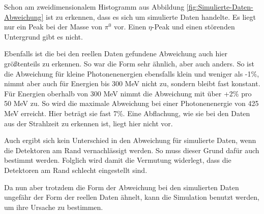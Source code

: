 \documentclass[a4paper,11pt,oneside,final,german,openbib,pdftex]{scrbook}
\begin{document}
{%

Schon am zweidimensionalem Histogramm aus Abbildung \ref{fig:Simulierte-Daten-Abweichung} ist zu erkennen, dass es sich um simulierte Daten handelte. Es liegt nur ein Peak bei der Masse von $\pi^0$ vor. Einen $\eta$-Peak und einen störenden Untergrund gibt es nicht. 

Ebenfalls ist die bei den reellen Daten gefundene Abweichung auch hier größtenteils zu erkennen. So war die Form sehr ähnlich, aber auch anders. So ist die Abweichung f\"ur kleine Photonenenergien ebensfalls klein und weniger als -1\%, nimmt aber auch f\"ur Energien bis 300 MeV nicht zu, sondern bleibt fast konstant. F\"ur Energien oberhalb von 300 MeV nimmt die Abweichung mit \"uber +2\% pro 50 MeV zu. So wird die maximale Abweichung bei einer Photonenenergie von 425 MeV erreicht. Hier betr\"agt sie fast 7\%. Eine Abflachung, wie sie bei den Daten aus der Strahlzeit zu erkennen ist, liegt hier nicht vor.

Auch ergibt sich kein Unterschied in den Abweichung für simulierte Daten, wenn die Detektoren am Rand vernachlässigt werden. So muss dieser Grund dafür auch bestimmt werden. Folglich wird damit die Vermutung widerlegt, dass die Detektoren am Rand schlecht eingestellt sind.



Da nun aber trotzdem die Form der Abweichung bei den simulierten Daten ungefähr der Form der reellen Daten ähnelt, kann die Simulation benutzt werden, um ihre Ursache zu bestimmen.

}
\end{document}
